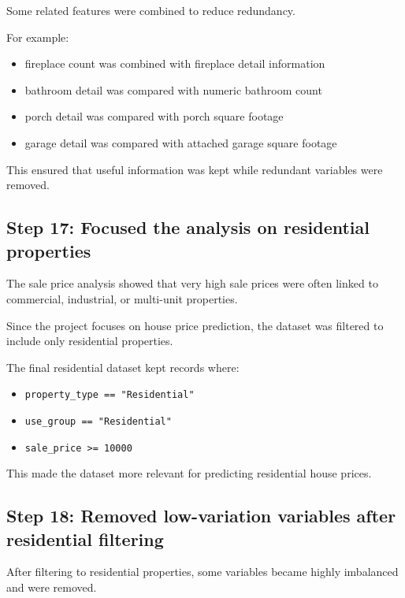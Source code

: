 \documentclass[
  english,
  letterpaper,
  DIV=11,
  numbers=noendperiod]{scrreprt}
\begin{document}
Some related features were combined to reduce redundancy.

For example:

\begin{itemize}
\item
  fireplace count was combined with fireplace detail information
\item
  bathroom detail was compared with numeric bathroom count
\item
  porch detail was compared with porch square footage
\item
  garage detail was compared with attached garage square footage
\end{itemize}

This ensured that useful information was kept while redundant variables
were removed.

\subsection{Step 17: Focused the analysis on residential
properties}\label{step-17-focused-the-analysis-on-residential-properties}

The sale price analysis showed that very high sale prices were often
linked to commercial, industrial, or multi-unit properties.

Since the project focuses on house price prediction, the dataset was
filtered to include only residential properties.

The final residential dataset kept records where:

\begin{itemize}
\item
  \texttt{property\_type\ ==\ "Residential"}
\item
  \texttt{use\_group\ ==\ "Residential"}
\item
  \texttt{sale\_price\ \textgreater{}=\ 10000}
\end{itemize}

This made the dataset more relevant for predicting residential house
prices.

\subsection{Step 18: Removed low-variation variables after residential
filtering}\label{step-18-removed-low-variation-variables-after-residential-filtering}

After filtering to residential properties, some variables became highly
imbalanced and were removed.
\end{document}
